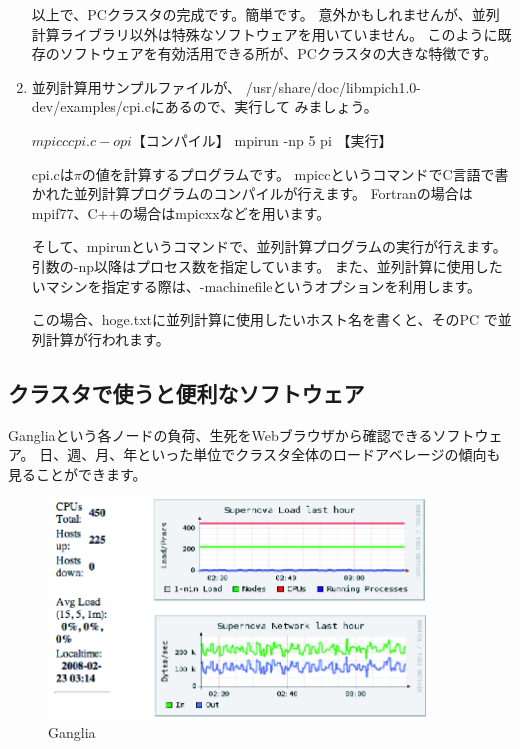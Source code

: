 \documentclass[mingoth,a4paper]{jsarticle}
\begin{document}
\begin{enumerate}
      以上で、PCクラスタの完成です。簡単です。
      意外かもしれませんが、並列計算ライブラリ以外は特殊なソフトウェアを用いていません。
      このように既存のソフトウェアを有効活用できる所が、PCクラスタの大きな特徴です。
 \item 並列計算用サンプルファイルが、
       /usr/share/doc/libmpich1.0-dev/examples/cpi.cにあるので、実行して
       みましょう。
\begin{commandline}
 $ mpicc cpi.c -o pi 【コンパイル】
 $ mpirun -np 5 pi   【実行】
\end{commandline}
       cpi.cは$\pi$の値を計算するプログラムです。
       mpiccというコマンドでC言語で書かれた並列計算プログラムのコンパイルが行えます。
       Fortranの場合はmpif77、C++の場合はmpicxxなどを用います。

       そして、mpirunというコマンドで、並列計算プログラムの実行が行えます。
       引数の-np以降はプロセス数を指定しています。
       また、並列計算に使用したいマシンを指定する際は、-machinefileというオプションを利用します。


       この場合、hoge.txtに並列計算に使用したいホスト名を書くと、そのPC
       で並列計算が行われます。
\end{enumerate}

\subsection{クラスタで使うと便利なソフトウェア}
Gangliaという各ノードの負荷、生死をWebブラウザから確認できるソフトウェア。
日、週、月、年といった単位でクラスタ全体のロードアベレージの傾向も見ることができます。

\begin{figure}[htbp]
 \begin{center}
  \includegraphics[width=100mm]{image200802/ganglia.png}
  \caption{Ganglia}
  \label{fig:ga-map}
 \end{center}
\end{figure}
\end{document}
